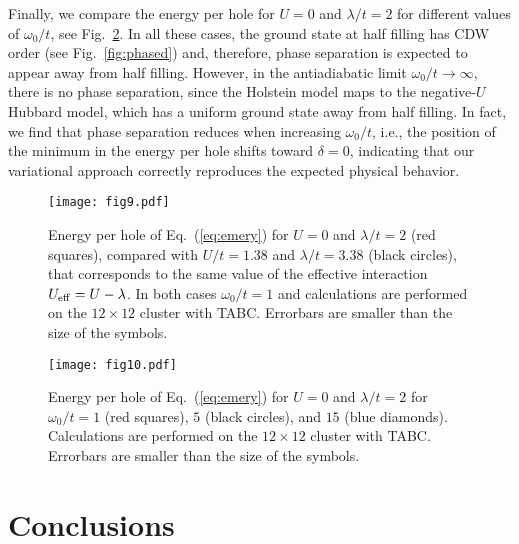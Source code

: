\documentclass[aps,superscriptaddress,amsmath,amssymb,twocolumn,showpacs,floatfix,english]{revtex4}
\begin{document}
Finally, we compare the energy per hole for $U=0$ and $\lambda/t=2$ for different values of $\omega_0/t$, see Fig.~\ref{fig:phasesep3}. 
In all these cases, the ground state at half filling has CDW order (see Fig.~\ref{fig:phased}) and, therefore, phase separation is expected 
to appear away from half filling. However, in the antiadiabatic limit $\omega_0/t \to \infty$, there is no phase separation, since the 
Holstein model maps to the negative-$U$ Hubbard model, which has a uniform ground state away from half filling. In fact, we find that phase 
separation reduces when increasing $\omega_0/t$, i.e., the position of the minimum in the energy per hole shifts toward $\delta=0$, indicating 
that our variational approach correctly reproduces the expected physical behavior.

\begin{figure}
\texttt{[image: fig9.pdf]}
\caption{\label{fig:phasesep2}
Energy per hole of Eq.~(\ref{eq:emery}) for $U=0$ and $\lambda/t=2$ (red squares), compared with $U/t=1.38$ and $\lambda/t=3.38$ (black 
circles), that corresponds to the same value of the effective interaction $U_{\rm eff}=U-\lambda$. In both cases $\omega_0/t=1$ and calculations
are performed on the $12 \times 12$ cluster with TABC. Errorbars are smaller than the size of the symbols.}
\end{figure}

\begin{figure}
\texttt{[image: fig10.pdf]}
\caption{\label{fig:phasesep3}
Energy per hole of Eq.~(\ref{eq:emery}) for $U=0$ and $\lambda/t=2$ for $\omega_0/t=1$ (red squares), $5$ (black circles), and $15$ (blue 
diamonds). Calculations are performed on the $12 \times 12$ cluster with TABC. Errorbars are smaller than the size of the symbols.}
\end{figure}

\section{Conclusions}\label{sec:conclusions}
\end{document}
